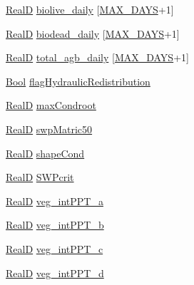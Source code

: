 \begin{DoxyCompactItemize}
\item 
\hyperlink{generic_8h_af1c105fd5732f70b91ddaeda0cc340e3}{RealD} \hyperlink{struct_veg_type_a46c4bcc0a97c701c1593ad6cbd4a0472}{biolive\+\_\+daily} \mbox{[}\hyperlink{_times_8h_a01f08d46080872b9f4284873b7f9dee4}{M\+A\+X\+\_\+\+D\+A\+YS}+1\mbox{]}
\item 
\hyperlink{generic_8h_af1c105fd5732f70b91ddaeda0cc340e3}{RealD} \hyperlink{struct_veg_type_a086af132e9ff5bd76be61b4845ca50b2}{biodead\+\_\+daily} \mbox{[}\hyperlink{_times_8h_a01f08d46080872b9f4284873b7f9dee4}{M\+A\+X\+\_\+\+D\+A\+YS}+1\mbox{]}
\item 
\hyperlink{generic_8h_af1c105fd5732f70b91ddaeda0cc340e3}{RealD} \hyperlink{struct_veg_type_a3536780e65f7db9527448c4ee08908b4}{total\+\_\+agb\+\_\+daily} \mbox{[}\hyperlink{_times_8h_a01f08d46080872b9f4284873b7f9dee4}{M\+A\+X\+\_\+\+D\+A\+YS}+1\mbox{]}
\item 
\hyperlink{generic_8h_a39db6982619d623273fad8a383489309}{Bool} \hyperlink{struct_veg_type_a83b9fc0e45b383d631fabbe83316fb41}{flag\+Hydraulic\+Redistribution}
\item 
\hyperlink{generic_8h_af1c105fd5732f70b91ddaeda0cc340e3}{RealD} \hyperlink{struct_veg_type_ad52fa22fc31200ff6ccf429746e947ad}{max\+Condroot}
\item 
\hyperlink{generic_8h_af1c105fd5732f70b91ddaeda0cc340e3}{RealD} \hyperlink{struct_veg_type_a2d8ff7ce9d54b9b2e83757ed5ca6ab1f}{swp\+Matric50}
\item 
\hyperlink{generic_8h_af1c105fd5732f70b91ddaeda0cc340e3}{RealD} \hyperlink{struct_veg_type_aea3b830249ff5131c0fbed64fc1f4c05}{shape\+Cond}
\item 
\hyperlink{generic_8h_af1c105fd5732f70b91ddaeda0cc340e3}{RealD} \hyperlink{struct_veg_type_a5eb5135d8e977bc384af507469e1f713}{S\+W\+Pcrit}
\item 
\hyperlink{generic_8h_af1c105fd5732f70b91ddaeda0cc340e3}{RealD} \hyperlink{struct_veg_type_afb4774c677b3cd85f2e36eab880c59d6}{veg\+\_\+int\+P\+P\+T\+\_\+a}
\item 
\hyperlink{generic_8h_af1c105fd5732f70b91ddaeda0cc340e3}{RealD} \hyperlink{struct_veg_type_a749ea4c1e5dc7b1a2ebc16c15de3015d}{veg\+\_\+int\+P\+P\+T\+\_\+b}
\item 
\hyperlink{generic_8h_af1c105fd5732f70b91ddaeda0cc340e3}{RealD} \hyperlink{struct_veg_type_a4a272eaac75b6ccef38abab3ad9afb0d}{veg\+\_\+int\+P\+P\+T\+\_\+c}
\item 
\hyperlink{generic_8h_af1c105fd5732f70b91ddaeda0cc340e3}{RealD} \hyperlink{struct_veg_type_a39610c665011659163a7398b01b3aa89}{veg\+\_\+int\+P\+P\+T\+\_\+d}

\end{DoxyCompactItemize}
